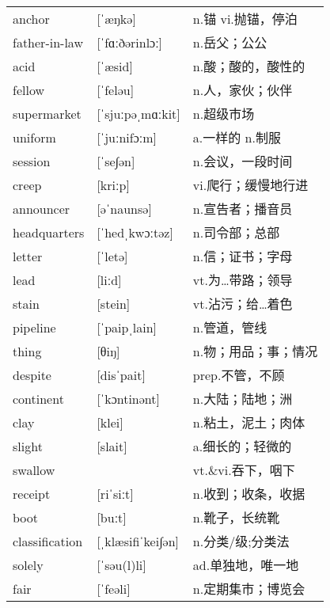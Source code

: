 \documentclass[a4paper]{article}
\begin{document}
\section{}
\begin{tabular}{l l l}

anchor & [ˈæŋkə] & n.锚 vi.抛锚，停泊 \\
father-in-law & [ˈfɑːðərinlɔː] & n.岳父；公公 \\
acid & [ˈæsid] & n.酸；酸的，酸性的 \\
fellow & [ˈfeləu] & n.人，家伙；伙伴 \\
supermarket & [ˈsjuːpəˌmɑːkit] & n.超级市场 \\
uniform & [ˈjuːnifɔːm] & a.一样的 n.制服 \\
session & [ˈse∫ən] & n.会议，一段时间 \\
creep & [kriːp] & vi.爬行；缓慢地行进 \\
announcer & [əˈnaunsə] & n.宣告者；播音员 \\
headquarters & [ˈhedˌkwɔːtəz] & n.司令部；总部 \\
letter & [ˈletə] & n.信；证书；字母 \\
lead & [liːd] & vt.为…带路；领导 \\
stain & [stein] & vt.沾污；给…着色 \\
pipeline & [ˈpaipˌlain] & n.管道，管线 \\
thing & [θiŋ] & n.物；用品；事；情况 \\
despite & [disˈpait] & prep.不管，不顾 \\
continent & [ˈkɔntinənt] & n.大陆；陆地；洲 \\
clay & [klei] & n.粘土，泥土；肉体 \\
slight & [slait] & a.细长的；轻微的 \\
swallow &  & vt.\&vi.吞下，咽下 \\
receipt & [riˈsiːt] & n.收到；收条，收据 \\
boot & [buːt] & n.靴子，长统靴 \\
classification & [ˌklæsifiˈkei∫ən] & n.分类/级;分类法 \\
solely & [ˈsəu(l)li] & ad.单独地，唯一地 \\
fair & [ˈfeəli] & n.定期集市；博览会 \\

\end{tabular}
\end{document}
